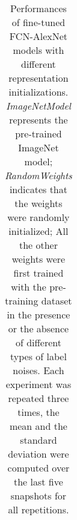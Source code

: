 \begin{table}[t]
{\begin{tabular}{l|llll}
\end{tabular}
}
\caption{Performances of fine-tuned FCN-AlexNet models with different representation initializations.
\textit{ImageNetModel} represents the pre-trained ImageNet model;
\textit{RandomWeights} indicates that the weights were randomly initialized;
All the other weights were first trained with the pre-training dataset in the presence or the absence of different types of label noises.
Each experiment was repeated three times, the mean and the standard deviation were computed over the last five snapshots for all repetitions.
}
\label{tab:robustness}
\end{table}
